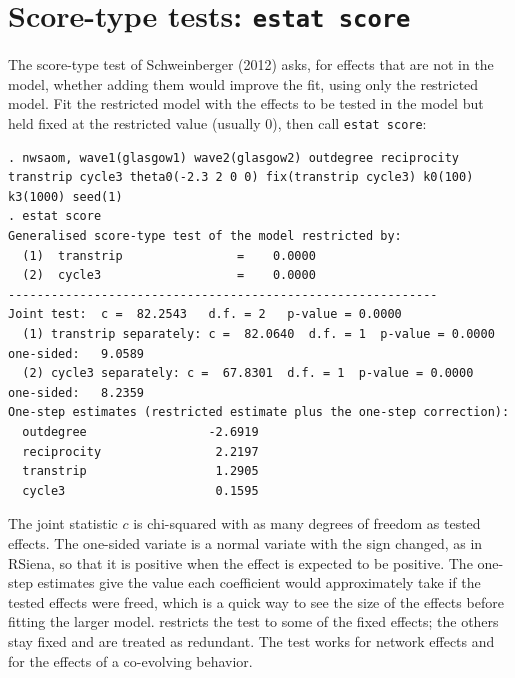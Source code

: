 \section{Score-type tests: \texttt{estat score}}

The score-type test of Schweinberger (2012) asks, for effects that are not in the model, whether adding them would improve the fit, using only the restricted model. Fit the restricted model with the effects to be tested in the model but held fixed at the restricted value (usually 0), then call \texttt{estat score}:
\begin{lstlisting}
. nwsaom, wave1(glasgow1) wave2(glasgow2) outdegree reciprocity transtrip cycle3 theta0(-2.3 2 0 0) fix(transtrip cycle3) k0(100) k3(1000) seed(1)
. estat score
Generalised score-type test of the model restricted by:
  (1)  transtrip                =    0.0000
  (2)  cycle3                   =    0.0000
------------------------------------------------------------
Joint test:  c =  82.2543   d.f. = 2   p-value = 0.0000
  (1) transtrip separately: c =  82.0640  d.f. = 1  p-value = 0.0000   one-sided:   9.0589
  (2) cycle3 separately: c =  67.8301  d.f. = 1  p-value = 0.0000   one-sided:   8.2359
One-step estimates (restricted estimate plus the one-step correction):
  outdegree                 -2.6919
  reciprocity                2.2197
  transtrip                  1.2905
  cycle3                     0.1595
\end{lstlisting}
The joint statistic $c$ is chi-squared with as many degrees of freedom as tested effects. The one-sided variate is a normal variate with the sign changed, as in RSiena, so that it is positive when the effect is expected to be positive. The one-step estimates give the value each coefficient would approximately take if the tested effects were freed, which is a quick way to see the size of the effects before fitting the larger model.  restricts the test to some of the fixed effects; the others stay fixed and are treated as redundant. The test works for network effects and for the effects of a co-evolving behavior.

